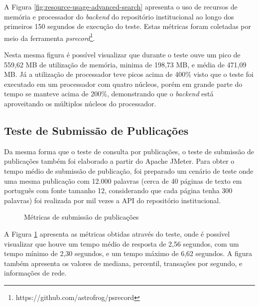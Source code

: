 A Figura \ref{fig:resource-usage-advanced-search} apresenta o uso de recursos
de memória e processador do \emph{backend} do repositório institucional ao longo
dos primeiros 150 segundos de execução do teste. Estas métricas foram coletadas por
meio da ferramenta \emph{psrecord}\footnote{https://github.com/astrofrog/psrecord}.

Nesta mesma figura é possível visualizar que durante o teste ouve um pico de 559,62 MB
de utilização de memória, minima de 198,73 MB, e média de 471,09 MB. Já a utilização de
processador teve picos acima de 400\% visto que o teste foi executado em um
processador com quatro núcleos, porém em grande parte do tempo se manteve acima de 200\%,
demonstrando que o \emph{backend} está aproveitando os múltiplos núcleos do processador.

\subsection{Teste de Submissão de Publicações}

Da mesma forma que o teste de consulta por publicações, o teste de submissão de
publicações também foi elaborado a partir do Apache JMeter. Para obter o tempo médio
de submissão de publicação, foi preparado um cenário de teste onde uma mesma publicação
com 12.000 palavras (cerca de 40 páginas de texto em português com fonte tamanho 12,
considerando que cada página tenha 300 palavras) foi realizada por mil vezes a API do
repositório institucional.

\begin{figure}[H]
    \caption{Métricas de submissão de publicações}
    \label{fig:matrics-create-research}
\end{figure}

A Figura \ref{fig:matrics-create-research} apresenta as métricas obtidas através do
teste, onde é possível visualizar que houve um tempo médio de resposta de 2,56 segundos,
com um tempo mínimo de 2,30 segundos, e um tempo máximo de 6,62 segundos. A figura também
apresenta os valores de mediana, percentil, transações por segundo, e informações de rede.

